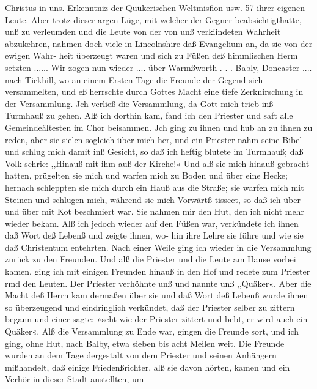 Christus in uns. Erkenntniz der Quükerischen Weltmisfion usw. 57
ihrer eigenen Leute. Aber trotz dieser argen Lüge, mit welcher der
Gegner beabsichtigthatte, unß zu verleumden und die Leute von
der von unß verkiindeten Wahrheit abzukehren, nahmen doch viele
in Lineolnshire daß Evangelium an, da sie von der ewigen Wahr-
heit überzeugt waren und sich zu Füßen deß himmlischen Herm
setzten ......
Wir zogen nun wieder .... über Warmßworth . . . Bably,
Doneaster .... nach Tickhill, wo an einem Ersten Tage die
Freunde der Gegend sich versammelten, und eß herrschte durch
Gottes Macht eine tiefe Zerknirschung in der Versammlung.
Jch verließ die Versammlung, da Gott mich trieb inß Turmhauß
zu gehen. Alß ich dorthin kam, fand ich den Priester und saft
alle Gemeindeältesten im Chor beisammen. Jch ging zu ihnen
und hub an zu ihnen zu reden, aber sie sielen sogleich über mich
her, und ein Priester nahm seine Bibel und schlug mich damit
inß Gesicht, so daß ich heftig blutete im Turmhauß; daß Volk
schrie: ,,Hinauß mit ihm auß der Kirche!« Und alß sie mich hinauß
gebracht hatten, prügelten sie mich und warfen mich zu Boden
und über eine Hecke; hernach schleppten sie mich durch ein Hauß
aus die Straße; sie warfen mich mit Steinen und schlugen mich,
während sie mich Vorwärtß tissect, so daß ich über und über mit
Kot beschmiert war. Sie nahmen mir den Hut, den ich nicht
mehr wieder bekam. Alß ich jedoch wieder auf den Füßen war,
verkündete ich ihnen daß Wort deß Lebenß und zeigte ihnen, wo-
hin ihre Lehre sie führe und wie sie daß Christentum entehrten. Nach
einer Weile ging ich wieder in die Versammlung zurück zu den
Freunden. Und alß die Priester und die Leute am Hause vorbei
kamen, ging ich mit einigen Freunden hinauß in den Hof und
redete zum Priester rmd den Leuten. Der Priester verhöhnte
unß und nannte unß ,,Quäker«. Aber die Macht deß Herrn
kam dermaßen über sie und daß Wort deß Lebenß wurde ihnen
so überzeugend und eindringlich verkündet, daß der Priester selber
zu zittern begann und einer sagte: »seht wie der Priester zittert
und bebt, er wird auch ein Quäker«. Alß die Versammlung zu
Ende war, gingen die Freunde sort, und ich ging, ohne Hut,
nach Balby, etwa sieben bis acht Meilen weit. Die Freunde
wurden an dem Tage dergestalt von dem Priester und seinen
Anhängern mißhandelt, daß einige Friedenßrichter, alß sie davon
hörten, kamen und ein Verhör in dieser Stadt anstellten, um


